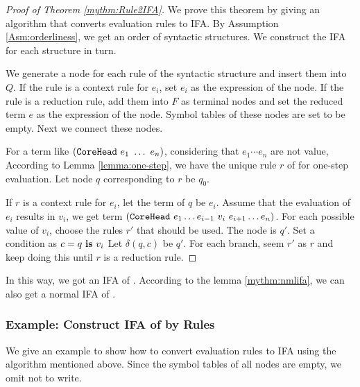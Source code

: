 \begin{proof}[Proof of Theorem \ref{mythm:Rule2IFA}]

We prove this theorem by giving an algorithm that converts evaluation rules to IFA. By Assumption \ref{Asm:orderliness}, we get an order of syntactic structures. We construct the IFA for each structure in turn.

We generate a node for each rule of the syntactic structure  and insert them into $Q$. If the rule is a context rule for $e_i$, set $e_i$ as the expression of the node. If the rule is a reduction rule, add them into $F$ as terminal nodes and set the reduced term $e$ as the expression of the node. Symbol tables of these nodes are set to be empty. Next we connect these nodes.

For a term like $(\mbox{\tt CoreHead}~e_1~\ldots~e_n)$, considering that $e_1\cdots e_n$ are not value, According to Lemma \ref{lemma:one-step}, we have the unique rule $r$ of  for one-step evaluation. Let node $q$ corresponding to $r$ be $q_0$.

If $r$ is a context rule for $e_i$, let the term of $q$ be $e_i$. Assume that the evaluation of $e_i$ results in $v_i$, we get term $(\mbox{\tt CoreHead}~e_1 \ldots e_{i-1}~v_i~e_{i+1} \ldots e_n)$. For each possible value of $v_i$, choose the rules $r'$ that should be used. The node is $q'$. Set a condition as $c=q~\mbox{\rm \bf is}~v_i$ Let $\delta(q, c)$ be $q'$. For each branch, seem $r'$ as $r$ and keep doing this until $r$ is a reduction rule.
\end{proof}

In this way, we got an IFA of . According to the lemma \ref{mythm:nmlifa}, we can also get a normal IFA of . 

\subsubsection{Example: Construct IFA of  by Rules}

We give an example to show how to convert evaluation rules to IFA using the algorithm mentioned above. Since the symbol tables of all nodes are empty, we omit not to write.


